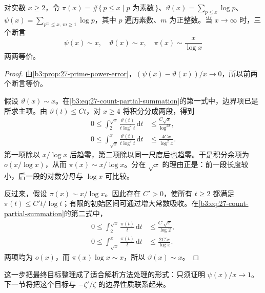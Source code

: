 \begin{proposition}\label{b3:prop:27-equivalences}
对实数 \(x\ge2\)，令 \(\pi(x)=\#\{\,p\le x\mid p\text{ 为素数}\,\}\)、\(\vartheta(x)=\sum_{p\le x}\log p\)、\(\psi(x)=\sum_{p^m\le x,\ m\ge1}\log p\)，其中 \(p\) 遍历素数、\(m\) 为正整数。当 \(x\to\infty\) 时，三个断言
\[
 \psi(x)\sim x,
 \quad \vartheta(x)\sim x,
 \quad \pi(x)\sim\frac{x}{\log x}
\]
两两等价。
\end{proposition}
\begin{proof}
由\cref{b3:prop:27-prime-power-error}，\((\psi(x)-\vartheta(x))/x\to0\)，所以前两个断言等价。

假设 \(\vartheta(x)\sim x\)。在\eqref{b3:eq:27-count-partial-summation}的第一式中，边界项已是所求主项。由 \(\vartheta(t)\le Ct\)，对 \(x\ge4\) 将积分分成两段，得到
\[
 \begin{aligned}
 0\le\int_2^{\sqrt x}\frac{\vartheta(t)}{t\log^2t}\,\mathrm dt
   &\le\frac{C\sqrt x}{\log^22},\\
 0\le\int_{\sqrt x}^x\frac{\vartheta(t)}{t\log^2t}\,\mathrm dt
   &\le\frac{4Cx}{\log^2x}.
 \end{aligned}
\]
第一项除以 \(x/\log x\) 后趋零，第二项除以同一尺度后也趋零。于是积分余项为 \(o(x/\log x)\)，从而 \(\pi(x)\sim x/\log x\)。分在 \(\sqrt x\) 的理由正是：前一段长度较小，后一段的对数分母与 \(\log x\) 可比较。

反过来，假设 \(\pi(x)\sim x/\log x\)。因此存在 \(C'>0\)，使所有 \(t\ge2\) 都满足 \(\pi(t)\le C't/\log t\)；有限的初始区间可通过增大常数吸收。在\eqref{b3:eq:27-count-partial-summation}的第二式中，
\[
 \begin{aligned}
 0\le\int_2^{\sqrt x}\frac{\pi(t)}t\,\mathrm dt
   &\le\frac{C'\sqrt x}{\log2},\\
 0\le\int_{\sqrt x}^x\frac{\pi(t)}t\,\mathrm dt
   &\le\frac{2C'x}{\log x}.
 \end{aligned}
\]
两项均为 \(o(x)\)，而 \(\pi(x)\log x\sim x\)，所以 \(\vartheta(x)\sim x\)。
\end{proof}

这一步把最终目标整理成了适合解析方法处理的形式：只须证明 \(\psi(x)/x\to1\)。下一节将把这个目标与 \(-\zeta'/\zeta\) 的边界性质联系起来。
